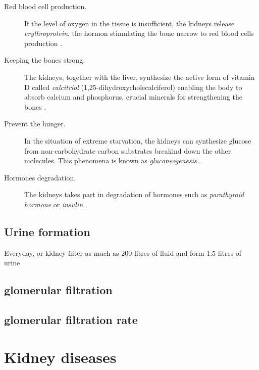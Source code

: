 \begin{description}
	\item [Red blood cell production.] If the level of oxygen in the tissue is insufficient, the kidneys release \textit{erythroprotein}, the hormon stimulating the bone narrow to red blood cells production \cite{donnelly2001erythropoietin}. 

\item [Keeping the bones strong.] The kidneys, together with the liver, synthesize the active form of vitamin D called \textit{calcitriol} (1,25-dihydroxycholecalciferol) enabling the body to absorb calcium and phosphorus, crucial minerals for strengthening the bones \cite{williams2009vitamin}.

\item [Prevent the hunger.] In the situation of extreme starvation, the kidneys can synthesize glucose from non-carbohydrate carbon substrates breakind down the other molecules. This phenomena is known as \textit{gluconeogenesis} \cite{newsholme1967control}.

\item [Hormones degradation.] The kidneys takes part in degradation of hormones such as \textit{parathyroid hormone} or \textit{insulin} \cite{emmanouel1980role}. 
%					
	\end{description} 

\subsection{Urine formation} 
Everyday, or kidney filter as much as 200 litres of fluid and form 1.5 litres of urine
\subsection{glomerular filtration} 
\subsection{glomerular filtration rate}

\section{Kidney diseases} 

 